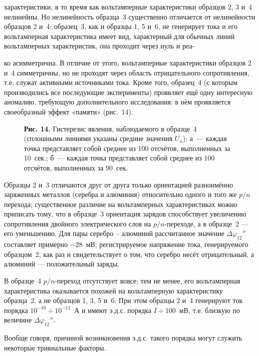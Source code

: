 \documentclass[12pt,a4paper]{article}
\begin{document}
\newpage

характеристики, в то время как вольтамперные характеристики образцов 2, 3 и~4
нелинейны. Но нелинейность образца~3 существенно отличается от нелинейности
образцов 2 и~4: образец~3, как и образцы 1, 5 и~6, не генерирует тока и его
вольтамперная характеристика имеет вид, характерный для обычных линий
вольтамперных характеристик, она проходит через нуль и реа-

ко асимметрична. В отличие от этого, вольтамперные характеристики образцов 2
и~4 симметричны, но не проходят через область отрицательного сопротивления,
т.е. служат активными источниками тока. Кроме того, образец~4 (с которым
производились все последующие эксперименты) проявляет ещё одну интересную
аномалию, требующую дополнительного исследования: в нём проявляется своеобразный
эффект «памяти» (рис.~14).

\begin{figure}[h]
\centering
\caption*{\textbf{Рис. 14.} Гистерезис явления, наблюдаемого в образце~4
(сплошными линиями указаны средние значения $U_n$): а~— каждая точка
представляет собой среднее из 100 отсчётов, выполненных за 10~сек.; б~—
каждая точка представляет собой среднее из 100 отсчётов, выполненных за 90~сек.}
\end{figure}

Образцы 2 и~3 отличаются друг от друга только ориентацией разноимённо
заряженных металлов (серебра и алюминия) относительно одного и того же $p/n$
перехода; существенное различие на вольтамперных характеристиках можно
приписать тому, что в образце~3 ориентация зарядов способствует увеличению
сопротивления двойного электрического слоя на $p/n$-переходе, а в образце~2 —
его уменьшению. Для пары серебро -- алюминий рассчитанное значение
$\Delta\varphi_{12}''$ составляет примерно $-28$~мВ; регистрируемое напряжение
тока, генерируемого образцом~2, как раз и свидетельствует о том, что серебро
несёт отрицательный, а алюминий — положительный заряды.

В образце~4 $p/n$-переход отсутствует вовсе; тем не менее, его вольтамперная
характеристика оказывается похожей на вольтамперную характеристику образца~2,
а не образцов 1, 3, 5 и~6. При этом образцы 2 и~4 генерируют ток порядка
$10^{-10} \div 10^{-11}$~А и имеют э.д.с. порядка $I \div 100$~мВ, т.е.
близкую по величине $\Delta\varphi_{12}''$.

Вообще говоря, причиной возникновения э.д.с. такого порядка могут служить
некоторые тривиальные факторы.
\end{document}

